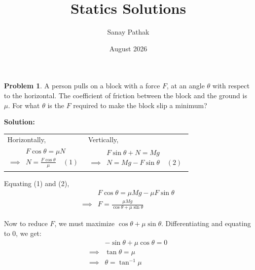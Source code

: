 \documentclass{article}
\title{Statics Solutions}
\author{Sanay Pathak}
\date{August 2026}
\theoremstyle{definition}
\newtheorem{problem}{Problem}
\newenvironment{solution}
  {\par\vspace{0.5em}\noindent\textbf{Solution:}\par\nopagebreak\vspace{0.3em}}
  {\par\vspace{1em}}
\begin{document}
\maketitle
\begin{problem}
    \begin{minipage}[t]{0.95\textwidth}
        A person pulls on a block with a force $F$, at an angle $\theta$ with respect to the horizontal. The coefficient of friction between the block and the ground is $\mu$.
        For what $\theta$ is the $F$ required to make the block slip a minimum?
    \end{minipage}
\end{problem}
\begin{solution}
\noindent
\begin{minipage}[t]{0.90\textwidth}
  \vspace{0pt}
  \begin{tabular}{@{}p{} p{}@{}}
    Horizontally, & Vertically, \\
    $\begin{aligned}
        &F \cos \theta = \mu N \\
        \implies &N = \frac{F \cos \theta}{\mu} \quad (1)
    \end{aligned}$ 
    & 
    $\begin{aligned}
        &F \sin \theta + N = Mg \\
        \implies &N = Mg - F \sin \theta \quad (2)
    \end{aligned}$
  \end{tabular}

  \vspace{1em}
  Equating (1) and (2),
  \begin{align*}
      &F \cos \theta = \mu Mg - \mu F \sin \theta \\
      \implies &F = \frac{\mu Mg}{\cos \theta + \mu \sin \theta}
  \end{align*}

  Now to reduce $F$, we must maximize $\cos \theta + \mu \sin \theta$. Differentiating and equating to $0$, we get:
  \begin{align*}
      &-\sin \theta + \mu \cos \theta = 0\\
      \implies &\tan \theta = \mu \\
      \implies &\theta = \tan^{-1}\mu
  \end{align*}
\end{minipage}%
\hfill
\begin{minipage}[t]{0.10\textwidth}
  \vspace{0pt}
  \centering
\end{minipage}
\end{solution}
\end{document}
